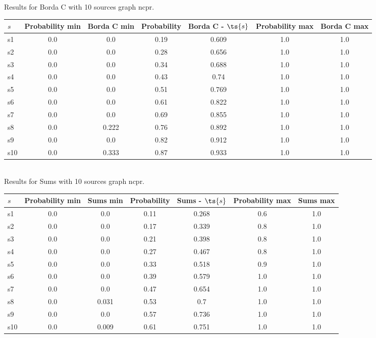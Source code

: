 \documentclass{article}
\begin{document}
\noindent Results for Borda C with 10 sources graph ncpr.

\noindent\begin{tabular}{|l|c|c|c|c|c|c|}
\hline
$s$& Probability min & Borda C min & Probability & Borda C - $\ts{s}$ & Probability max & Borda C max\\
\hline
s1 &0.0 & 0.0 & 0.19 & 0.609 & 1.0 & 1.0\\
\hline
s2 &0.0 & 0.0 & 0.28 & 0.656 & 1.0 & 1.0\\
\hline
s3 &0.0 & 0.0 & 0.34 & 0.688 & 1.0 & 1.0\\
\hline
s4 &0.0 & 0.0 & 0.43 & 0.74 & 1.0 & 1.0\\
\hline
s5 &0.0 & 0.0 & 0.51 & 0.769 & 1.0 & 1.0\\
\hline
s6 &0.0 & 0.0 & 0.61 & 0.822 & 1.0 & 1.0\\
\hline
s7 &0.0 & 0.0 & 0.69 & 0.855 & 1.0 & 1.0\\
\hline
s8 &0.0 & 0.222 & 0.76 & 0.892 & 1.0 & 1.0\\
\hline
s9 &0.0 & 0.0 & 0.82 & 0.912 & 1.0 & 1.0\\
\hline
s10 &0.0 & 0.333 & 0.87 & 0.933 & 1.0 & 1.0\\
\hline
\end{tabular}\\

\noindent Results for Sums with 10 sources graph ncpr.

\noindent\begin{tabular}{|l|c|c|c|c|c|c|}
\hline
$s$& Probability min & Sums min & Probability & Sums - $\ts{s}$ & Probability max & Sums max\\
\hline
s1 &0.0 & 0.0 & 0.11 & 0.268 & 0.6 & 1.0\\
\hline
s2 &0.0 & 0.0 & 0.17 & 0.339 & 0.8 & 1.0\\
\hline
s3 &0.0 & 0.0 & 0.21 & 0.398 & 0.8 & 1.0\\
\hline
s4 &0.0 & 0.0 & 0.27 & 0.467 & 0.8 & 1.0\\
\hline
s5 &0.0 & 0.0 & 0.33 & 0.518 & 0.9 & 1.0\\
\hline
s6 &0.0 & 0.0 & 0.39 & 0.579 & 1.0 & 1.0\\
\hline
s7 &0.0 & 0.0 & 0.47 & 0.654 & 1.0 & 1.0\\
\hline
s8 &0.0 & 0.031 & 0.53 & 0.7 & 1.0 & 1.0\\
\hline
s9 &0.0 & 0.0 & 0.57 & 0.736 & 1.0 & 1.0\\
\hline
s10 &0.0 & 0.009 & 0.61 & 0.751 & 1.0 & 1.0\\
\hline
\end{tabular}\\
\end{document}
